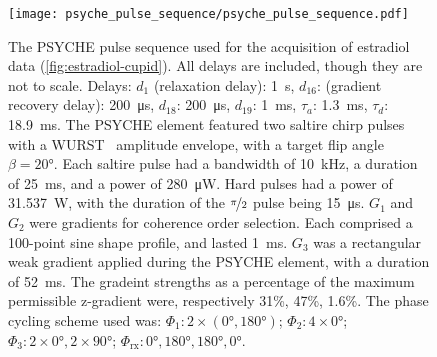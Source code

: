 \begin{figure}[H]
    \texttt{[image: psyche\_pulse\_sequence/psyche\_pulse\_sequence.pdf]}
    \caption[
        The \acs{PSYCHE} pulse sequence used for the acquisition of the estradiol
        data presented in \cref{fig:estradiol-cupid}.
    ]{
        The \acs{PSYCHE} pulse sequence used for the acquisition of estradiol
        data (\cref{fig:estradiol-cupid}). All
        delays are included, though they are not to scale.
        Delays:
        $d_1$ (relaxation delay): \qty{1}{\second},
        $d_{16}$: (gradient recovery delay): \qty{200}{\micro\second},
        $d_{18}$: \qty{200}{\micro\second},
        $d_{19}$: \qty{1}{\milli\second},
        $\tau_a$: \qty{1.3}{\milli\second},
        $\tau_d$: \qty{18.9}{\milli\second}.
        The \ac{PSYCHE} element featured two saltire chirp pulses with a
        \ac{WURST}~\cite{ODell2013}
        amplitude envelope, with a target flip angle $\beta = \ang{20}$.
        Each saltire pulse
        had a bandwidth of \qty{10}{\kilo\hertz},
        a duration of \qty{25}{\milli\second},
        and a power of \qty{280}{\micro\watt}.
        Hard pulses
        had a power of \qty{31.537}{\watt},
        with the duration of the $\nicefrac{\pi}{2}$ pulse being \qty{15}{\micro\second}.
        $G_1$ and $G_2$ were gradients for coherence order selection.
        Each comprised a 100-point sine shape profile, and lasted
        \qty{1}{\milli\second}.
        $G_3$ was a rectangular weak gradient applied during the PSYCHE
        element, with a duration of \qty{52}{\milli\second}.
        The gradeint strengths as a percentage of the maximum permissible
        z-gradient were, respectively 31\%, 47\%, 1.6\%.
        The phase cycling scheme used was:
        $\Phi_1: 2 \times (\ang{0}, \ang{180})$;
        $\Phi_2: 4 \times \ang{0}$;
        $\Phi_3: 2 \times \ang{0}, 2 \times \ang{90}$;
        $\Phi_{\text{rx}}: \ang{0}, \ang{180}, \ang{180}, \ang{0}$.
    }
    \label{fig:psyche}

\end{figure}
\clearpage

